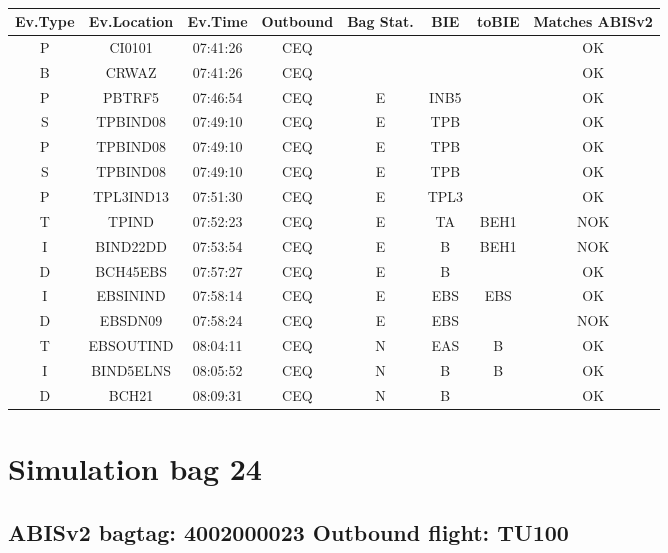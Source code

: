 \documentclass{report}
\begin{document}
\paragraph{}
\begin{longtable}{cccccccc}    \toprule
\rowcolor{white!50}
\textbf{Ev.Type} & \textbf{Ev.Location} & \textbf{Ev.Time} & \textbf{Outbound} & \textbf{Bag Stat.} & \textbf{BIE} & \textbf{toBIE} & \textbf{Matches ABISv2} \\\midrule
P & CI0101 & 07:41:26  & CEQ &  &  &  & OK\\
B & CRWAZ & 07:41:26  & CEQ &  &  &  & OK\\
P & PBTRF5 & 07:46:54  & CEQ & E & INB5 &  & OK\\
S & TPBIND08 & 07:49:10  & CEQ & E & TPB &  & OK\\
P & TPBIND08 & 07:49:10  & CEQ & E & TPB &  & OK\\
S & TPBIND08 & 07:49:10  & CEQ & E & TPB &  & OK\\
P & TPL3IND13 & 07:51:30  & CEQ & E & TPL3 &  & OK\\
T & TPIND & 07:52:23  & CEQ & E & TA & BEH1 & NOK\\
I & BIND22DD & 07:53:54  & CEQ & E & B & BEH1 & NOK\\
D & BCH45EBS & 07:57:27  & CEQ & E & B &  & OK\\
I & EBSININD & 07:58:14  & CEQ & E & EBS & EBS & OK\\
D & EBSDN09 & 07:58:24  & CEQ & E & EBS &  & NOK\\
T & EBSOUTIND & 08:04:11  & CEQ & N & EAS & B & OK\\
I & BIND5ELNS & 08:05:52  & CEQ & N & B & B & OK\\
D & BCH21 & 08:09:31  & CEQ & N & B &  & OK\\
\bottomrule
\end{longtable}
\pagebreak
\section*{Simulation bag 24}
\subsection*{ABISv2 bagtag: 4002000023 Outbound flight: TU100}
\end{document}
